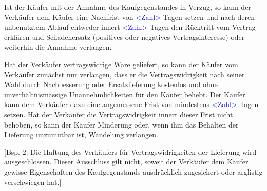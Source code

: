 \documentclass[parskip=half]{scrreprt}
\begin{document}
\begin{contract}
Ist der Käufer mit der Annahme des Kaufgegenstandes in Verzug, so kann der Verkäufer dem Käufer eine Nachfrist von \textcolor{blue}{<Zahl>} Tagen setzen und nach deren unbenutztem Ablauf entweder innert \textcolor{blue}{<Zahl>} Tagen den Rücktritt vom Vertrag erklären und Schadenersatz (positives oder negatives Vertragsinteresse) oder weiterhin die Annahme verlangen.

\parnumbertrue





Hat der Verkäufer vertragswidrige Ware geliefert, so kann der Käufer vom Verkäufer zunächst nur verlangen, dass er die Vertragswidrigkeit nach seiner Wahl durch Nachbesserung oder Ersatzlieferung kostenlos und ohne unverhältnismässige Unannehmlichkeiten für den Käufer behebt. Der Käufer kann dem Verkäufer dazu eine angemessene Frist von mindestens \textcolor{blue}{<Zahl>} Tagen setzen. Hat der Verkäufer die Vertragswidrigkeit innert dieser Frist nicht behoben, so kann der Käufer Minderung oder, wenn ihm das Behalten der Lieferung unzumutbar ist, Wandelung verlangen.


[Bsp. 2: Die Haftung des Verkäufers für Vertragswidrigkeiten der Lieferung wird ausgeschlossen. Dieser Ausschluss gilt nicht, soweit der Verkäufer dem Käufer gewisse Eigenschaften des Kaufgegenstands ausdrücklich zugesichert oder arglistig verschwiegen hat.]
\parnumbertrue


\end{contract}
\end{document}
